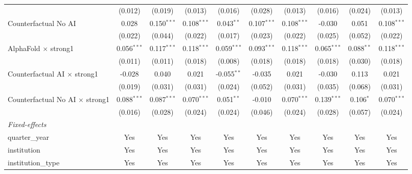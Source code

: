 \begin{tabular}{lccccccccc}
                                          & (0.012)       & (0.019)       & (0.013)       & (0.016)       & (0.028)       & (0.013)       & (0.016)       & (0.024)      & (0.013)\\   
   Counterfactual No AI                   & 0.028         & 0.150$^{***}$ & 0.108$^{***}$ & 0.043$^{**}$  & 0.107$^{***}$ & 0.108$^{***}$ & -0.030        & 0.051        & 0.108$^{***}$\\   
                                          & (0.022)       & (0.044)       & (0.022)       & (0.017)       & (0.023)       & (0.022)       & (0.025)       & (0.052)      & (0.022)\\   
   AlphaFold $\times$ strong1             & 0.056$^{***}$ & 0.117$^{***}$ & 0.118$^{***}$ & 0.059$^{***}$ & 0.093$^{***}$ & 0.118$^{***}$ & 0.065$^{***}$ & 0.088$^{**}$ & 0.118$^{***}$\\   
                                          & (0.011)       & (0.011)       & (0.018)       & (0.008)       & (0.018)       & (0.018)       & (0.018)       & (0.030)      & (0.018)\\   
   Counterfactual AI $\times$ strong1     & -0.028        & 0.040         & 0.021         & -0.055$^{**}$ & -0.035        & 0.021         & -0.030        & 0.113        & 0.021\\   
                                          & (0.019)       & (0.031)       & (0.031)       & (0.024)       & (0.052)       & (0.031)       & (0.035)       & (0.068)      & (0.031)\\   
   Counterfactual No AI $\times$ strong1  & 0.088$^{***}$ & 0.087$^{***}$ & 0.070$^{***}$ & 0.051$^{**}$  & -0.010        & 0.070$^{***}$ & 0.139$^{***}$ & 0.106$^{*}$  & 0.070$^{***}$\\   
                                          & (0.016)       & (0.028)       & (0.024)       & (0.024)       & (0.046)       & (0.024)       & (0.028)       & (0.057)      & (0.024)\\   
   \midrule
   \emph{Fixed-effects}\\
   quarter\_year                          & Yes           & Yes           & Yes           & Yes           & Yes           & Yes           & Yes           & Yes          & Yes\\  
   institution                            & Yes           & Yes           & Yes           & Yes           & Yes           & Yes           & Yes           & Yes          & Yes\\  
   institution\_type                      & Yes           & Yes           & Yes           & Yes           & Yes           & Yes           & Yes           & Yes          & Yes\\  

\end{tabular}

